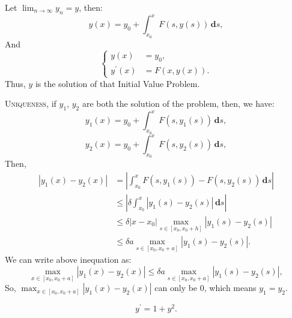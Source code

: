 \documentclass[en, normal, 11pt, black]{elegantnote}
\newenvironment{exercise}[1]{\begin{tcolorbox}[colback=black!15, colframe=black!80, breakable, title=#1]}{\end{tcolorbox}}
\renewenvironment{proof}{\begin{tcolorbox}[colback=white, colframe=black!50, breakable, title=Proof. ]\setlength{\parskip}{0.8em}}{\,\\\rightline{$\square$}\end{tcolorbox}}
\newcommand{\der}{\,\mathbf{d}}
\begin{document}
\begin{proof}
        Let $\lim_{n\to\infty}y_n=y$, then: 
        \[y(x)=y_0+\int_{x_0}^xF(s,y(s))\der s, \]
        And 
        \begin{equation*}
            \left\{
                \begin{aligned}
                    y(x)&=y_0, \\
                    y^\prime(x)&=F(x, y(x)). 
                \end{aligned}
            \right.
        \end{equation*}
        Thus, $y$ is the solution of that Initial Value Problem. 
    \end{proof}
    \begin{proof}
        \textsc{Uniqueness}, if $y_1$, $y_2$ are both the solution of the problem, then, we have: 
        \[y_1(x)=y_0+\int_{x_0}^xF(s,y_1(s))\der s, \]
        \[y_2(x)=y_0+\int_{x_0}^xF(s,y_2(s))\der s, \]
        Then, 
        \begin{align*}
            |y_1(x)-y_2(x)|&=\left|\int_{x_0}^xF(s,y_1(s))-F(s,y_2(s))\der s\right|\\
            &\leqslant\left|\delta\int_{x_0}^x|y_1(s)-y_2(s)|\der s\right|\\
            &\leqslant\delta |x-x_0| \max_{s\in [x_0,x_0+h]}|y_1(s)-y_2(s)|\\
            &\leqslant \delta a \max_{s\in [x_0,x_0+a]}|y_1(s)-y_2(s)|. 
        \end{align*}
        We can write above inequation as: 
        \[\max_{x\in [x_0, x_0+a]}|y_1(x)-y_2(x)|\leqslant \delta a \max_{s\in [x_0,x_0+a]}|y_1(s)-y_2(s)|, \]
        So, $\max_{x\in [x_0, x_0+a]}|y_1(x)-y_2(x)|$ can only be $0$, which means $y_1=y_2$. 
    \end{proof}
    \begin{exercise}{\textsc{Exercise. }1}
        \[y^\prime=1+y^2.\]
    \end{exercise}
\end{document}
